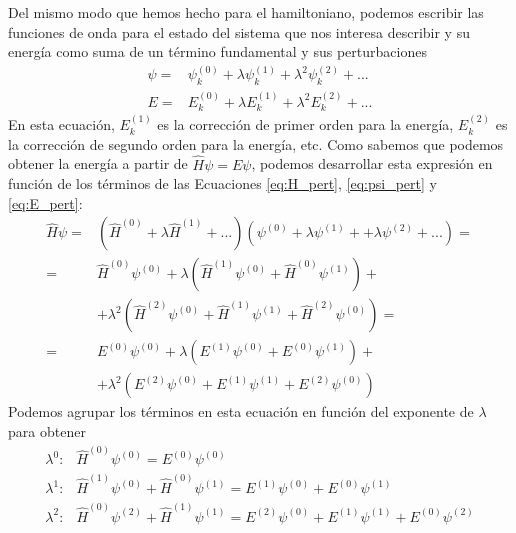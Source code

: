 Del mismo modo que hemos hecho para el hamiltoniano, 
podemos escribir las funciones de onda para el estado
del sistema que nos interesa describir y su energía 
como suma de un término fundamental y sus perturbaciones
\begin{align}
    \psi =& \psi_k^{(0)} + \lambda\psi_k^{(1)} + \lambda^2\psi_k^{(2)} + ... \label{eq:psi_pert}\\
    E =& E_k^{(0)} + \lambda E_k^{(1)} + \lambda^2E_k^{(2)}+ ...
    \label{eq:E_pert}
\end{align}
En esta ecuación, $E_k^{(1)}$ es la corrección de primer orden
para la energía,  $E_k^{(2)}$ es la corrección de segundo orden 
para la energía, etc. Como sabemos que podemos obtener la energía
a partir de $\hat{H}\psi = E\psi$, podemos desarrollar esta
expresión en función de los términos de las Ecuaciones
\ref{eq:H_pert}, \ref{eq:psi_pert} y \ref{eq:E_pert}:
\begin{equation}
\begin{split}
    \hat{H}\psi =& (\hat{H}^{(0)} + \lambda \hat{H}^{(1)} + ...)(\psi^{(0)} + \lambda\psi^{(1)} +  + \lambda\psi^{(2)} + ...) = \\
    =& \hat{H}^{(0)}\psi^{(0)} + 
    \lambda (\hat{H}^{(1)}\psi^{(0)} + \hat{H}^{(0)}\psi^{(1)}) + \\ 
    &+ \lambda^2 (\hat{H}^{(2)}\psi^{(0)} + \hat{H}^{(1)}\psi^{(1)} + \hat{H}^{(2)}\psi^{(0)} ) =  \\
    =& E^{(0)}\psi^{(0)} + \lambda (E^{(1)}\psi^{(0)} + E^{(0)}\psi^{(1)}) + \\
    &+ \lambda^2 (E^{(2)}\psi^{(0)} + E^{(1)}\psi^{(1)} + E^{(2)}\psi^{(0)})
\end{split}
\end{equation}
Podemos agrupar los términos en esta ecuación en función del
exponente de $\lambda$ para obtener
\begin{align}
    \lambda^0\mathrm{:} & \hat{H}^{(0)}\psi^{(0)}= E^{(0)}\psi^{(0)}\label{eq:HE_pert0}\\
    \lambda^1\mathrm{:}&
    \hat{H}^{(1)}\psi^{(0)} + \hat{H}^{(0)}\psi^{(1)} = E^{(1)}\psi^{(0)} + E^{(0)}\psi^{(1)} \label{eq:HE_pert1}\\
    \lambda^2\mathrm{:}  &     
     \hat{H}^{(0)}\psi^{(2)} + \hat{H}^{(1)}\psi^{(1)} = E^{(2)}\psi^{(0)} + E^{(1)}\psi^{(1)}+ E^{(0)}\psi^{(2)}
\end{align}

